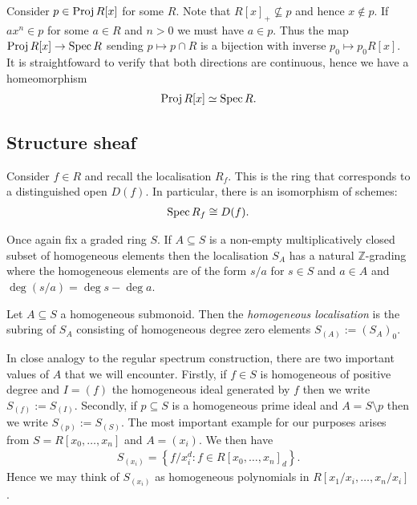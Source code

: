 \documentclass{article}
\begin{document}
\begin{example}\label{ex:proj0_homeo}
  Consider $p\in\operatorname{Proj} R[x]$ for some $R$.
  Note that $R[x]_+\not\subseteq p$ and
  hence $x\not\in p$. If $ax^n\in p$ for some $a\in R$ and $n>0$
  we must have $a\in p$. Thus the map $\operatorname{Proj} R[x] \to \operatorname{Spec} R$
  sending $p \mapsto p \cap R$ is a bijection with inverse
  $p_0 \mapsto p_0 R[x]$. It is straightfoward to verify that both
  directions are continuous, hence we have a homeomorphism
  \begin{align*}
    \operatorname{Proj} R[x] \simeq \operatorname{Spec} R.
  \end{align*}
\end{example}

\subsection{Structure sheaf}


Consider $f\in R$ and recall the localisation $R_f$. This is the ring
that corresponds to a distinguished open $D(f)$. In particular,
there is an isomorphism of schemes:
\begin{align*}
  \operatorname{Spec} R_f \cong D(f).
\end{align*}

Once again fix a graded ring $S$.
If $A\subseteq S$ is a non-empty multiplicatively closed subset
of homogeneous elements then the localisation $S_A$ has a
natural $\mathbb{Z}$-grading where the homogeneous elements
are of the form $s/a$ for $s\in S$ and $a\in A$ and
$\deg(s/a) = \deg s - \deg a$.

\begin{definition}
  Let $A\subseteq S$ a homogeneous submonoid. Then the \emph{homogeneous
  localisation} is the subring of $S_A$ consisting of homogeneous degree zero
  elements $S_{(A)} := (S_A)_0$.
\end{definition}

In close analogy to the regular spectrum construction, there are two important
values of $A$ that we will encounter. Firstly, if $f\in S$ is homogeneous of
positive degree and $I=(f)$ the homogeneous ideal generated by $f$ then we
write $S_{(f)}:=S_{(I)}$. Secondly, if $p\subseteq S$ is a homogeneous prime
ideal and $A=S\setminus p$ then we write $S_{(p)} := S_{(S)}$.
The most important example for our purposes arises from
$S = R[x_0,\ldots,x_n]$ and $A=(x_i)$. We then have
\begin{align*}
  S_{(x_i)} = \left\lbrace{f / x_i^d : f\in R[x_0,\ldots,x_n]_d}\right\rbrace.
\end{align*}
Hence we may think of $S_{(x_i)}$ as homogeneous
polynomials in $R[x_1/x_i,\ldots,x_n/x_i]$.
\end{document}
